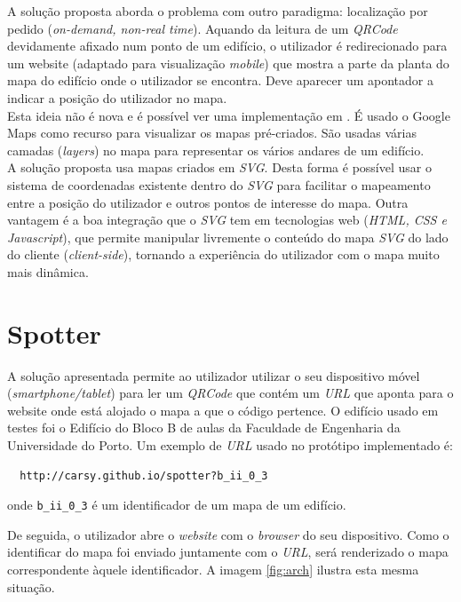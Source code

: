 \documentclass[twocolumn,twoside,11pt]{article}
\newcommand{\svg}{\emph{SVG}}
\newcommand{\qrcode}{\emph{QRCode}}
\begin{document}
  A solução proposta aborda o problema com outro paradigma: localização por pedido (\emph{on-demand, non-real time}).
  Aquando da leitura de um \qrcode{} \cite{Wkhlu2008} devidamente afixado num ponto de um edifício, o utilizador é redirecionado para um website (adaptado para visualização \emph{mobile}) que mostra a parte da planta do mapa do edifício onde o utilizador se encontra.
  Deve aparecer um apontador a indicar a posição do utilizador no mapa.
  \\
  Esta ideia não é nova e é possível ver uma implementação em \cite{Costa2011}.
  É usado o Google Maps como recurso para visualizar os mapas pré-criados.
  São usadas várias camadas (\emph{layers}) no mapa para representar os vários andares de um edifício.
  \\

  A solução proposta usa mapas criados em \svg.
  Desta forma é possível usar o sistema de coordenadas existente dentro do \svg{} para facilitar o mapeamento entre a posição do utilizador e outros pontos de interesse do mapa.
  Outra vantagem é a boa integração que o \svg{} tem em tecnologias web (\emph{HTML, CSS e Javascript}), que permite manipular livremente o conteúdo do mapa \svg{} do lado do cliente (\emph{client-side}), tornando a experiência do utilizador com o mapa muito mais dinâmica.



\section{Spotter} %
\label{sec:solucao}

  A solução apresentada permite ao utilizador utilizar o seu dispositivo móvel (\emph{smartphone/tablet}) para ler um \qrcode{} que contém um \emph{URL} que aponta para o website onde está alojado o mapa a que o código pertence.
  O edifício usado em testes foi o Edifício do Bloco B de aulas da Faculdade de Engenharia da Universidade do Porto.
  Um exemplo de \emph{URL} usado no protótipo implementado é:

  \begin{verbatim}
  http://carsy.github.io/spotter?b_ii_0_3\end{verbatim}
  onde \verb+b_ii_0_3+ é um identificador de um mapa de um edifício.

  De seguida, o utilizador abre o \emph{website} com o \emph{browser} do seu dispositivo.
  Como o identificar do mapa foi enviado juntamente com o \emph{URL}, será renderizado o mapa correspondente àquele identificador. 
  A imagem \ref{fig:arch} ilustra esta mesma situação.
\end{document}
